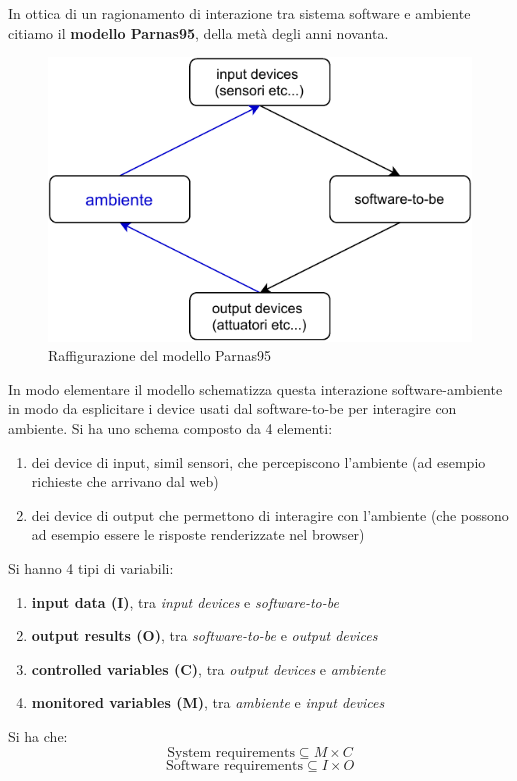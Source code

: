 \documentclass[a4paper,12pt, oneside]{book}
\begin{document}
In ottica di un ragionamento di interazione tra sistema software e ambiente
citiamo il \textbf{modello Parnas95}, della metà degli anni novanta. 
\begin{figure}
  \centering
  \includegraphics[scale = 0.7]{img/re.pdf}
  \caption{Raffigurazione del modello Parnas95}
\end{figure}
\newpage
In modo elementare il modello schematizza
questa interazione software-ambiente in modo da esplicitare i device usati dal
software-to-be per interagire con ambiente. Si ha uno schema composto da 4
elementi:

\begin{enumerate}
  \item dei device di input, simil sensori, che percepiscono l'ambiente (ad
  esempio richieste che arrivano dal web)
  \item dei device di output che permettono di interagire con l'ambiente (che
  possono ad esempio essere le risposte renderizzate nel browser)
\end{enumerate}
Si hanno 4 tipi di variabili:
\begin{enumerate}
  \item \textbf{input data (I)}, tra \textit{input devices} e
  \textit{software-to-be}
  \item \textbf{output results (O)}, tra \textit{software-to-be} e
  \textit{output devices}
  \item \textbf{controlled variables  (C)}, tra \textit{output devices} e
  \textit{ambiente}
  \item \textbf{monitored variables (M)}, tra \textit{ambiente} e
  \textit{input devices}
\end{enumerate}
Si ha che:
\[\mbox{System requirements}\subseteq M\times C\]
\[\mbox{Software requirements}\subseteq I\times O\]
\end{document}

